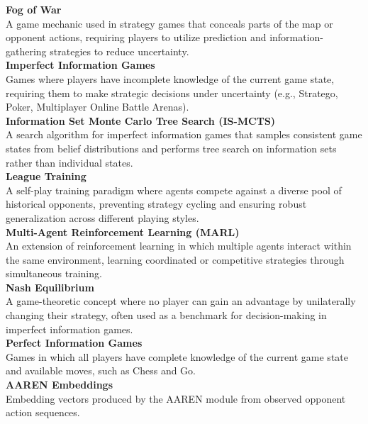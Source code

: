 \noindent\textbf{Fog of War} \\
A game mechanic used in strategy games that conceals parts of the map or opponent actions, requiring players to utilize prediction and information-gathering strategies to reduce uncertainty. \\[6pt]

\noindent\textbf{Imperfect Information Games} \\
Games where players have incomplete knowledge of the current game state, requiring them to make strategic decisions under uncertainty (e.g., Stratego, Poker, Multiplayer Online Battle Arenas). \\[6pt]

\noindent\textbf{Information Set Monte Carlo Tree Search (IS-MCTS)} \\
A search algorithm for imperfect information games that samples consistent game states from belief distributions and performs tree search on information sets rather than individual states. \\[6pt]

\noindent\textbf{League Training} \\
A self-play training paradigm where agents compete against a diverse pool of historical opponents, preventing strategy cycling and ensuring robust generalization across different playing styles. \\[6pt]

\noindent\textbf{Multi-Agent Reinforcement Learning (MARL)} \\
An extension of reinforcement learning in which multiple agents interact within the same environment, learning coordinated or competitive strategies through simultaneous training. \\[6pt]

\noindent\textbf{Nash Equilibrium} \\
A game-theoretic concept where no player can gain an advantage by unilaterally changing their strategy, often used as a benchmark for decision-making in imperfect information games. \\[6pt]

\noindent\textbf{Perfect Information Games} \\
Games in which all players have complete knowledge of the current game state and available moves, such as Chess and Go. \\[6pt]

\noindent\textbf{AAREN Embeddings} \\
Embedding vectors produced by the AAREN module from observed opponent action sequences. \\[6pt]


